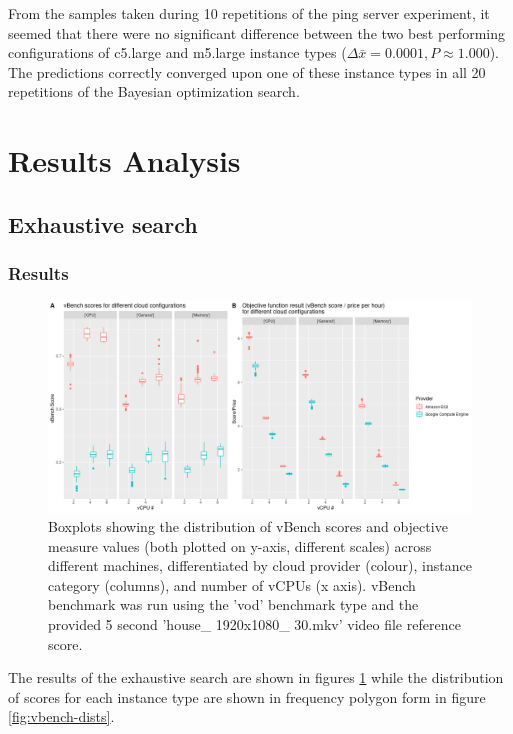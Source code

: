\documentclass{report}
\begin{document}
From the samples taken during 10 repetitions of the ping server experiment, it seemed that there were no significant difference between the two best performing configurations of c5.large and m5.large instance types ($\Delta \bar{x}=0.0001, P \approx 1.000$). The predictions correctly converged upon one of these instance types in all 20 repetitions of the Bayesian optimization search.



\section{Results Analysis}
\subsection{Exhaustive search}
\subsubsection{Results}
\begin{figure}
  \centering
   \includegraphics[scale=0.6]{exh_search}
   \caption{Boxplots showing the distribution of vBench scores and objective measure values (both plotted on y-axis, different scales) across different machines, differentiated by cloud provider (colour), instance category (columns), and number of vCPUs (x axis). vBench benchmark was run using the 'vod' benchmark type and the provided 5 second 'house\_ 1920x1080\_ 30.mkv' video file reference score.}
  \label{fig:exh-search}
\end{figure}

The results of the exhaustive search are shown in figures \ref{fig:exh-search} while the distribution of scores for each instance type are shown in frequency polygon form in figure \ref{fig:vbench-dists}.
\end{document}
